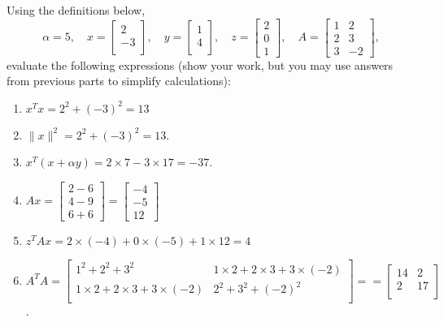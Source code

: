 \documentclass{article}
\def\blu#1{{\color{blu}#1}}
\def\norm#1{\|#1\|}
\def\enum#1{\begin{enumerate}#1\end{enumerate}}
\begin{document}
\noindent Using the definitions below,
\[
\alpha = 5,\quad
x = \left[\begin{array}{c}
2\\
-3\\
\end{array}\right], \quad
y = \left[\begin{array}{c}
1\\
4\\
\end{array}\right],\quad
z = \left[\begin{array}{c}
2\\
0\\
1\end{array}\right],
\quad
A = \left[\begin{array}{ccc}
1 & 2\\
2 & 3\\
3 & -2
\end{array}\right],
\]
\blu{evaluate the following expressions} (show your work, but you may use answers from previous parts to simplify calculations):\\
\enum{
\item $x^Tx=2^2+(-3)^2=13$
\item $\norm{x}^2=2^2+(-3)^2=13$.
\item $x^T(x + \alpha y)=2\times7-3\times17=-37$.
\item $Ax= \left[\begin{array}{c}
2-6\\
4-9\\
6+6
\end{array}\right]
= \left[\begin{array}{c}
-4\\
-5\\
12
\end{array}\right]
$
\item $z^TAx=2\times(-4)+0\times(-5)+1\times12=4$
\item $A^TA=\left[\begin{array}{ccc}
1^2+2^2+3^2 & 1\times2+2\times3+3\times(-2)\\
1\times2+2\times3+3\times(-2)& 2^2+3^2+(-2)^2\\
\end{array}\right]
==\left[\begin{array}{ccc}
14 & 2\\
2& 17\\
\end{array}\right]$.
}
\end{document}

